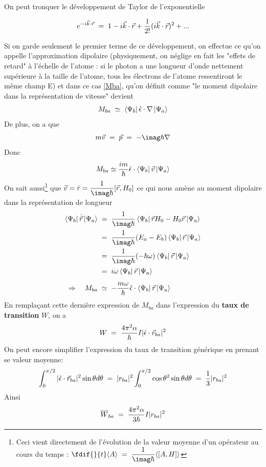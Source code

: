On peut tronquer le développement de Taylor de l'exponentielle

\begin{equation}
    e^{-i\vec{k}\cdot\vec{r}}\; = \; 1-i\vec{k}\cdot\vec{r}+\dfrac{1}{2!}(i\vec{k}\cdot\vec{r})^2+...
    \label{eq:dvpl_expo}
\end{equation}

Si on garde seulement le premier terme de ce développement, on effectue ce qu'on appelle l'approximation dipolaire (physiquement, on néglige en fait les "effets de retard" à l'échelle de l'atome : si le photon a une longueur d'onde nettement supérieure à la taille de l'atome, tous les électrons de l'atome ressentiront le même champ E) et dans ce cas \eqref{Mba}, qu'on définit comme "le moment dipolaire dans la représentation de vitesse" devient
\[
    M_{ba} \;\simeq\; \bra{\Psi_b}\hat{\epsilon}\cdot\nabla\ket{\Psi_a}
\]
De plus, on a que 
\[
    m\vec{v}\eq \vec{p}\eq -\imag\hbar \nabla
\]
Donc
\[
    M_{ba} \simeq \dfrac{im}{\hbar}\hat{\epsilon}\cdot\bra{\Psi_b}\vec{v}\ket{\Psi_a}
\]
On sait aussi\footnote{Ceci vient directement de l'évolution de la valeur moyenne d'un opérateur au cours du temps : $\fdif{}{t}\langle A \rangle \eq \dfrac{1}{\imag\hbar}\langle[A,H] \rangle$} que $\vec{v}=\dot{r}=\dfrac{1}{\imag\hbar}[\vec{r},H_0]$ ce qui nous amène au moment dipolaire dans la représentation de longueur
\begin{align*}
    \bra{\Psi_b}\dot{\vec{r}}\ket{\Psi_a}
    &\eq 
    \dfrac{1}{\imag\hbar}\bra{\Psi_b}\vec{r}H_0-H_0\vec{r}\ket{\Psi_a}\\
    &\eq 
    \dfrac{1}{\imag\hbar}(E_a-E_b)\bra{\Psi_b}\vec{r}\ket{\Psi_a}\\
    &\eq 
    \dfrac{1}{\imag\hbar}(-\hbar \omega)\bra{\Psi_b}\vec{r}\ket{\Psi_a} \\
    &\eq  
    i \omega \bra{\Psi_b}\vec{r}\ket{\Psi_a} \\[5pt]
    \Rightarrow \quad M_{ba} &\;\simeq\; 
    -\dfrac{m \omega}{\hbar}\hat{\epsilon}\cdot\bra{\Psi_b}\vec{r}\ket{\Psi_a}
\end{align*}
En remplaçant cette dernière expression de $M_{ba}$ dans l'expression du \textbf{taux de transition} $W$, on a 
\[
    W\; = \; \dfrac{4\pi^2 \alpha}{\hbar}I |\hat{\epsilon}\cdot\vec{r}_{ba}|^2
\]
On peut encore simplifier l'expression du taux de transition générique en prenant se valeur moyenne:
\[
    \int_{0}^{\pi/2} |\hat{\epsilon}\cdot\vec{r}_{ba}|^2\sin{\theta} d\theta\; = \; |r_{ba}|^2\int_{0}^{\pi/2}\cos{\theta}^2\sin{\theta}d\theta\; = \; \dfrac{1}{3}|r_{ba}|^2
\]
Ainsi
\begin{equation}
    \overline{W}_{ba}\; = \; \dfrac{4\pi^2 \alpha}{3 \hbar}I |r_{ba}|^2
\end{equation}



